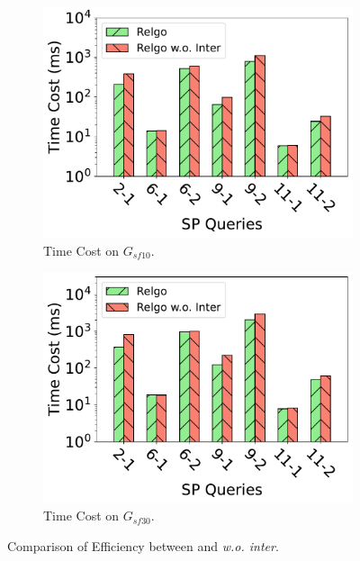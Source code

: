 \begin{figure}[ht]
    \centering
    \begin{subfigure}[b]{.45\linewidth}
        \centering
        \includegraphics[width=\linewidth]{./figures/exp/filter_sf10.pdf}
        \caption{Time Cost on $G_{sf10}$.}
        \label{fig:exp-filter-sf10}
    \end{subfigure}
    \begin{subfigure}[b]{0.45\linewidth}
        \centering
        \includegraphics[width=\linewidth]{./figures/exp/filter_sf30.pdf}
        \caption{Time Cost on $G_{sf30}$.}
        \label{fig:exp-filter-sf30}
    \end{subfigure}
    \caption{Comparison of Efficiency between \relgo and \textit{\relgo w.o. inter}.}
    \label{fig:exp-filter}
\end{figure}


